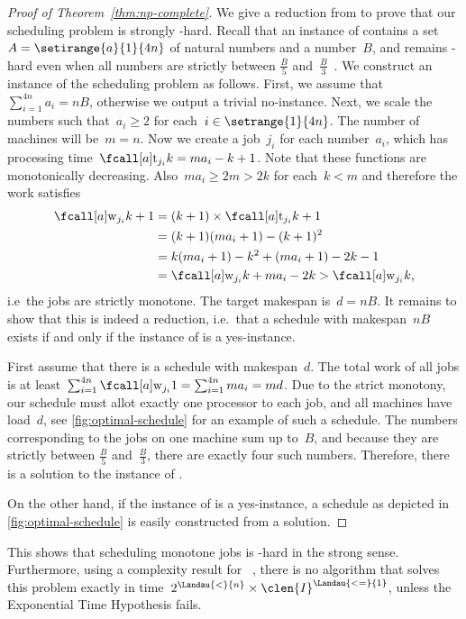 \begin{proof}[Proof of Theorem~\ref{thm:np-complete}]
We give a reduction from  to prove that our scheduling problem is strongly -hard.
Recall that an instance of  contains a set~$A = \setirange{a}{1}{4n}$ of natural numbers and a number~$B$,
and remains -hard even when all numbers are strictly between $\frac{B}{5}$ and~$\frac{B}{3}$~\cite{garey79}.
We construct an instance of the scheduling problem as follows.
First, we assume that $\sum_{i = 1}^{4n} a_i = nB$,
otherwise we output a trivial no-instance.
Next, we scale the numbers such that~$a_i \geq 2$ for each~$i \in \setrange{1}{4n}$.
The number of machines will be~$m = n$.
Now we create a job~$j_i$ for each number~$a_i$, which has processing time~$\ptm{j_i}{k} = m a_i - k + 1$.
Note that these functions are monotonically decreasing.
Also~$m a_i \geq 2m > 2k$ for each~$k < m$ and therefore the work satisfies
\begin{equation}
  \label{eq:reduction-monotone}
  \begin{aligned}
    \work{j_i}{k+1} &= (k+1) \times \ptm{j_i}{k+1} \\
    &= (k+1)(m a_i + 1) - (k+1)^2 \\
    &= k (m a_i + 1) - k^2 + (m a_i + 1) - 2k - 1 \\
    &= \work{j_i}{k} + m a_i - 2k
    > \work{j_i}{k} \dpunct{,}
  \end{aligned}
\end{equation}
i.e~the jobs are strictly monotone.
The target makespan is~$d = nB$.
It remains to show that this is indeed a reduction,
i.e.~that a schedule with makespan~$nB$ exists if and only if the instance of  is a yes-instance.

First assume that there is a schedule with makespan~$d$.
The total work of all jobs is at least~$\sum_{i = 1}^{4n} \work{j_i}{1} = \sum_{i = 1}^{4n} m a_i = m d$.
Due to the strict monotony, our schedule must allot exactly one processor to each job,
and all machines have load~$d$,
see \cref{fig:optimal-schedule} for an example of such a schedule.
The numbers corresponding to the jobs on one machine sum up to~$B$,
and because they are strictly between $\frac{B}{5}$ and~$\frac{B}{3}$,
there are exactly four such numbers.
Therefore, there is a solution to the instance of .

On the other hand, if the instance of  is a yes-instance,
a schedule as depicted in \cref{fig:optimal-schedule} is easily constructed from a solution.
\end{proof}

This shows that scheduling monotone jobs is -hard in the strong sense.
Furthermore, using a complexity result for ~\cite{jansen13b},
there is no algorithm that solves this problem exactly in time~$2^{\Landau{<}{n}} \times \clen{I}^{\Landau{<=}{1}}$,
unless the Exponential Time Hypothesis fails.
